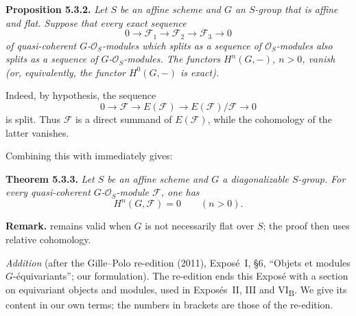 \medskip
\noindent{}\textbf{Proposition 5.3.2.}
\textit{Let \(S\) be an affine scheme and \(G\) an \(S\)-group that is
affine and flat. Suppose that every exact sequence
\[
  0\longrightarrow\mathscr F_1
   \longrightarrow\mathscr F_2
   \longrightarrow\mathscr F_3
   \longrightarrow0
\]
of quasi-coherent \(G\)-\(\mathscr O_S\)-modules which splits as a sequence
of \(\mathscr O_S\)-modules also splits as a sequence of
\(G\)-\(\mathscr O_S\)-modules. The functors \(H^n(G,-)\), \(n>0\), vanish
(or, equivalently, the functor \(H^0(G,-)\) is exact).}

Indeed, by hypothesis, the sequence
\[
  0\longrightarrow\mathscr F
   \longrightarrow E(\mathscr F)
   \longrightarrow E(\mathscr F)/\mathscr F
   \longrightarrow0
\]
is split. Thus \(\mathscr F\) is a direct summand of \(E(\mathscr F)\),
while the cohomology of the latter vanishes.

Combining this with  immediately gives:

\medskip
\noindent{}\textbf{Theorem 5.3.3.}
\textit{Let \(S\) be an affine scheme and \(G\) a diagonalizable
\(S\)-group. For every quasi-coherent \(G\)-\(\mathscr O_S\)-module
\(\mathscr F\), one has}
\[
  H^n(G,\mathscr F)=0\qquad(n>0).
\]

\medskip
\noindent\textbf{Remark.}
 remains valid when \(G\) is not necessarily flat over
\(S\); the proof then uses relative cohomology.

\par\bigskip\noindent{}%
\emph{Addition} (after the Gille--Polo re-edition (2011), Exposé~I, \S6,
``Objets et modules \(G\)-équivariants''; our formulation). The re-edition
ends this Exposé with a section on equivariant objects and modules, used in
Exposés~II, III and VI\textsubscript{B}. We give its content in our own
terms; the numbers in brackets are those of the re-edition.

